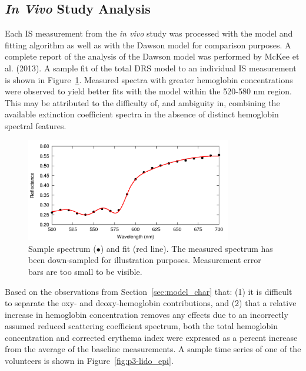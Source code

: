 \subsection{\emph{In Vivo} Study Analysis}
Each IS measurement from the \emph{in vivo} study was processed with the model and fitting algorithm as well as with the Dawson model for comparison purposes. A complete report of the analysis of the Dawson model was performed by McKee et al. (2013).\cite{McKee2013} A sample fit of the total DRS model to an individual IS measurement is shown in Figure~\ref{fig:p3-sample_fit}. Measured spectra with greater hemoglobin concentrations were observed to yield better fits with the model within the 520-580 nm region. This may be attributed to the difficulty of, and ambiguity in, combining the available extinction coefficient spectra in the absence of distinct hemoglobin spectral features. 

\begin{figure}
	\centering \includegraphics[width=0.8\textwidth]{figures/p3-sample_fit.png}
	\caption[Sample DRS spectrum and model fit]{\label{fig:p3-sample_fit}Sample spectrum ($\bullet$) and fit (red line). The measured spectrum has been down-sampled for illustration purposes. Measurement error bars are too small to be visible.}
\end{figure}

Based on the observations from Section~\ref{sec:model_char} that: (1) it is difficult to separate the oxy- and deoxy-hemoglobin contributions, and (2) that a relative increase in hemoglobin concentration removes any effects due to an incorrectly assumed reduced scattering coefficient spectrum, both the total hemoglobin concentration and corrected erythema index were expressed as a percent increase from the average of the baseline measurements. A sample time series of one of the volunteers is shown in Figure~\ref{fig:p3-lido_epi}.

